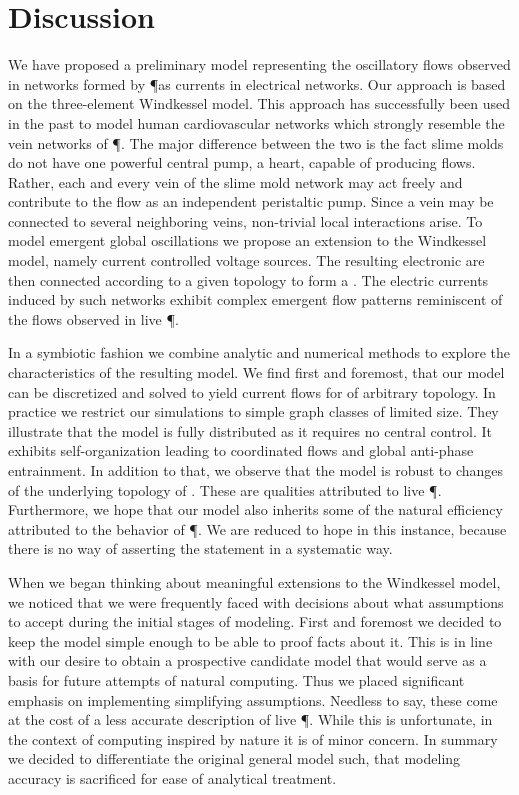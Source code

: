 \section{Discussion}

	We have proposed a preliminary model representing the oscillatory flows observed in networks formed by \P as currents in electrical networks. Our approach is based on the three-element Windkessel model. This approach has successfully been used in the past to model human cardiovascular networks which strongly resemble the vein networks of \P. The major difference between the two is the fact slime molds do not have one powerful central pump, \ie a heart, capable of producing flows. Rather, each and every vein of the slime mold network may act freely and contribute to the flow as an independent peristaltic pump. Since a vein may be connected to several neighboring veins, non-trivial local interactions arise. To model emergent global oscillations we propose an extension to the Windkessel model, namely current controlled voltage sources. The resulting electronic \Pes are then connected according to a given topology to form a \Pn. The electric currents induced by such networks exhibit complex emergent flow patterns reminiscent of the flows observed in live \P.

	In a symbiotic fashion we combine analytic and numerical methods to explore the characteristics of the resulting model. We find first and foremost, that our model can be discretized and solved to yield current flows for \Pn of arbitrary topology. In practice we restrict our simulations to simple graph classes of limited size. They illustrate that the model is fully distributed as it requires no central control. It exhibits self-organization leading to coordinated flows and global anti-phase entrainment. In addition to that, we observe that the model is robust to changes of the underlying topology of \Pns. These are qualities attributed to live \P. Furthermore, we hope that our model also inherits some of the natural efficiency attributed to the behavior of \P. We are reduced to hope in this instance, because there is no way of asserting the statement in a systematic way.

	When we began thinking about meaningful extensions to the Windkessel model, we noticed that we were frequently faced with decisions about what assumptions to accept during the initial stages of modeling. First and foremost we decided to keep the model simple enough to be able to proof facts about it. This is in line with our desire to obtain a prospective candidate model that would serve as a basis for future attempts of natural computing. Thus we placed significant emphasis on implementing simplifying assumptions. Needless to say, these come at the cost of a less accurate description of live \P. While this is unfortunate, in the context of computing inspired by nature it is of minor concern. In summary we decided to differentiate the original general model such, that modeling accuracy is sacrificed for ease of analytical treatment.

